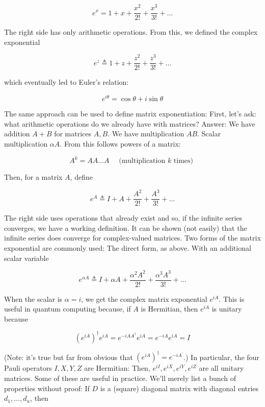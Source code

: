 \documentclass[main.tex]{subfiles}
\begin{document}
    $$
    e^{x}=1+x+\frac{x^{2}}{2 !}+\frac{x^{3}}{3 !}+\ldots
    $$
    
    The right side has only arithmetic operations. From this, we defined the complex exponential
    
    $$
    e^{z} \triangleq 1+z+\frac{z^{2}}{2 !}+\frac{z^{3}}{3 !}+\ldots
    $$
    
    which eventually led to Euler's relation:
    
    $$
    e^{i \theta}=\cos \theta+i \sin \theta
    $$
    
    The same approach can be used to define matrix exponentiation: First, let's ask: what arithmetic operations do we already have with matrices? Answer: We have addition $A+B$ for matrices $A, B$. We have multiplication $A B$. Scalar multiplication $\alpha A$. From this follows powers of a matrix:
    
    $$
    A^{k}=A A \ldots A \quad \text { (multiplication } k \text { times) }
    $$
    
    Then, for a matrix $A$, define
    
    $$
    e^{A} \triangleq I+A+\frac{A^{2}}{2 !}+\frac{A^{3}}{3 !}+\ldots
    $$
    
    The right side uses operations that already exist and so, if the infinite series converges, we have a working definition. It can be shown (not easily) that the infinite series does converge for complex-valued matrices. Two forms of the matrix exponential are commonly used: The direct form, as above. With an additional scalar variable
    
    $$
    e^{\alpha A} \triangleq I+\alpha A+\frac{\alpha^{2} A^{2}}{2 !}+\frac{\alpha^{3} A^{3}}{3 !}+\ldots
    $$
    
    When the scalar is $\alpha=i$, we get the complex matrix exponential $e^{i A}$. This is useful in quantum computing because, if $A$ is Hermitian, then $e^{i A}$ is unitary because
    
    $$
    \left(e^{i A}\right)^{\dagger} e^{i A}=e^{-i A A^{\dagger}} e^{i A}=e^{-i A} e^{i A}=I
    $$
    
    (Note: it's true but far from obvious that $\left(e^{i A}\right)^{\dagger}=e^{-i A^{\prime}}$.) In particular, the four Pauli operators $I, X, Y, Z$ are Hermitian: Then, $e^{i I}, e^{i X}, e^{i Y}, e^{i Z}$ are all unitary matrices. Some of these are useful in practice. We'll merely list a bunch of properties without proof: If $D$ is a (square) diagonal matrix with diagonal entries $d_{1}, \ldots, d_{n}$, then
    
\end{document}
